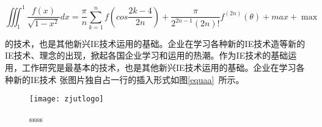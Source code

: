 \begin{equation}
\label{equaa}
\iiint_1^1\frac{f(x)}{\sqrt{1-x^2}}dx = \frac{\pi}{n}\sum_{k=1}^nf(cos\frac{2k-4}{2n})+\frac{\pi}{2^{2n-1}(2n)!}f^{(2n)}(\theta)+max+\max
\end{equation}

的技术，也是其他新兴IE技术运用的基础。企业在学习各种新的IE技术造等新的IE技术、理念的出现，掀起各国企业学习和运用的热潮。作为IE技术的基础运用，工作研究是最基本的技术，也是其他新兴IE技术运用的基础。企业在学习各种新的IE技术
张图片独自占一行的插入形式如图\eqref{equaa}~所示。

\begin{figure}
\caption{ssss}\label{5555}
\texttt{[image: zjutlogo]}



\end{figure}
